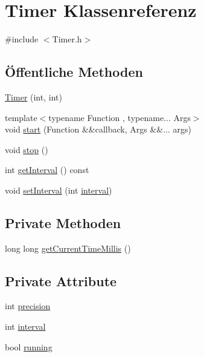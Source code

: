 \hypertarget{class_timer}{}\section{Timer Klassenreferenz}
\label{class_timer}


{\ttfamily \#include $<$Timer.\+h$>$}

\subsection*{Öffentliche Methoden}
\begin{DoxyCompactItemize}
\item 
\hyperlink{class_timer_a5712c673f940c048eaa49440e9a57fab}{Timer} (int, int)
\item 
{\footnotesize template$<$typename Function , typename... Args$>$ }\\void \hyperlink{class_timer_adcf70b5065e31461e27309c96065437a}{start} (Function \&\&callback, Args \&\&... args)
\item 
void \hyperlink{class_timer_a63f0eb44b27402196590a03781515dba}{stop} ()
\item 
int \hyperlink{class_timer_a998fabc8cce38394c4b4536fc81db438}{get\+Interval} () const
\item 
void \hyperlink{class_timer_aa88ef228247b40496f8474253bda3a0e}{set\+Interval} (int \hyperlink{class_timer_a8bdff3d549795a1efc0588edaa127b15}{interval})
\end{DoxyCompactItemize}
\subsection*{Private Methoden}
\begin{DoxyCompactItemize}
\item 
long long \hyperlink{class_timer_a39a332f8ce3a45ed8d78c772755342c8}{get\+Current\+Time\+Millis} ()
\end{DoxyCompactItemize}
\subsection*{Private Attribute}
\begin{DoxyCompactItemize}
\item 
int \hyperlink{class_timer_a71742840f2c6d4d6ab085b2eb439545a}{precision}
\item 
int \hyperlink{class_timer_a8bdff3d549795a1efc0588edaa127b15}{interval}
\item 
bool \hyperlink{class_timer_a3b8bb57a0a252c88f85c0592715ea425}{running}
\end{DoxyCompactItemize}


